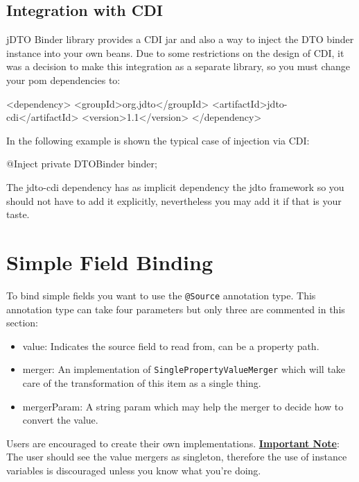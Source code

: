 \documentclass[11pt]{article}
\newcommand{\JDTO}{jDTO Binder\xspace}
\begin{document}
\subsection{Integration with CDI}

\JDTO library provides a CDI jar and also a way to inject the DTO binder instance into your own beans. Due to some restrictions on the design of CDI, it was a decision to make this integration as a separate library, so you must change your pom dependencies to:


\begin{xml}
    <dependency>
        <groupId>org.jdto</groupId>
        <artifactId>jdto-cdi</artifactId>
        <version>1.1</version>
    </dependency>
\end{xml}

In the following example is shown the typical case of injection via CDI:


\begin{java}
@Inject
private DTOBinder binder;
\end{java}

The jdto-cdi dependency has as implicit dependency the jdto framework so you should not have to add it explicitly, nevertheless you may add it if that is your taste.
 

\section{Simple Field Binding}


To bind simple fields you want to use the \texttt{@Source} annotation type.
This annotation type can take four parameters but only three are commented in this section:

\begin{itemize}
 \item value: Indicates the source field to read from, can be a property path.
 \item merger: An implementation of \texttt{SinglePropertyValueMerger} which will take care of the transformation of this item as a single thing.
 \item mergerParam: A string param which may help the merger to decide how to convert the value.
\end{itemize}

Users are encouraged to create their own implementations. \textbf{\underline{Important Note}}: The user should see
the value mergers as singleton, therefore the use of instance variables is discouraged unless you know what you're doing.
\end{document}
